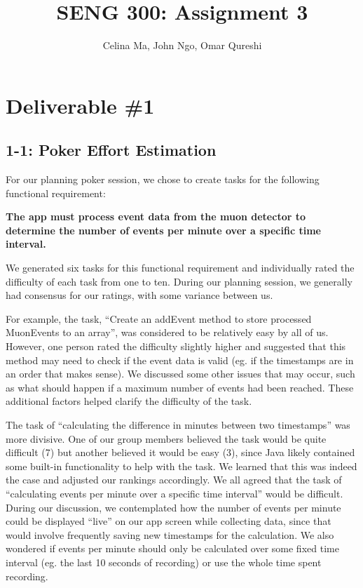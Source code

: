 \documentclass[11pt,a4paper]{article}
\title{\vspace{-2.0cm} \textbf{SENG 300: Assignment 3}}
\author{Celina Ma, John Ngo, Omar Qureshi}
\begin{document}
\maketitle
\def\textfraction{.01}
\def\topfraction{.99}
\section*{Deliverable \#1}

\subsection*{1-1: Poker Effort Estimation}

For our planning poker session, we chose to create tasks for the following functional requirement:

\textbf{The app must process event data from the muon detector to determine the number of events per minute over a specific time interval.}

We generated six tasks for this functional requirement and individually rated the difficulty of each task from one to ten. During our planning session, we generally had consensus for our ratings, with some variance between us. 

For example, the task, “Create an addEvent method to store processed MuonEvents to an array”, was considered to be relatively easy by all of us. However, one person rated the difficulty slightly higher and suggested that this method may need to check if the event data is valid (eg. if the timestamps are in an order that makes sense). We discussed some other issues that may occur, such as what should happen if a maximum number of events had been reached. These additional factors helped clarify the difficulty of the task.

The task of “calculating the difference in minutes between two timestamps” was more divisive. One of our group members believed the task would be quite difficult (7) but another believed it would be easy (3), since Java likely contained some built-in functionality to help with the task. We learned that this was indeed the case and adjusted our rankings accordingly.
We all agreed that the task of “calculating events per minute over a specific time interval” would be difficult. During our discussion, we contemplated how the number of events per minute could be displayed “live” on our app screen while collecting data, since that would involve frequently saving new timestamps for the calculation. We also wondered if events per minute should only be calculated over some fixed time interval (eg. the last 10 seconds of recording) or use the whole time spent recording.
\end{document}

